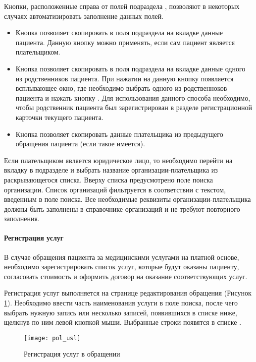 Кнопки, расположенные справа от полей подраздела , позволяют в некоторых случаях автоматизировать заполнение данных полей. 
\begin{itemize}
	\item Кнопка  позволяет скопировать в поля подраздела  на вкладке  данные пациента. Данную кнопку можно применять, если сам пациент является плательщиком.
	\item Кнопка  позволяет скопировать в поля подраздела  на вкладке  данные одного из родственников пациента. При нажатии на данную кнопку появляется всплывающее окно, где необходимо выбрать одного из родственноков пациента и нажать кнопку . Для использования данного способа необходимо, чтобы родственник пациента был зарегистрирован в разделе  регистрационной карточки текущего пациента.
	\item Кнопка  позволяет скопировать данные плательщика из предыдущего обращения пациента (если такое имеется).
\end{itemize} 

Если плательщиком является юридическое лицо, то необходимо перейти на вкладку  в подразделе  и выбрать название организации-плательщика из раскрывающегося списка. Вверху списка предусмотрено поле поиска организации. Список организаций фильтруется в соответствии с текстом, введенным в поле поиска. Все необходимые реквизиты организации-плательщика должны быть заполнены в справочнике организаций и не требуют повторного заполнения.

\paragraph{Регистрация услуг} \label{ev_regusl}

В случае обращения пациента за медицинскими услугами на платной основе, необходимо зарегистрировать список услуг, которые будут оказаны пациенту, согласовать стоимость и оформить договор на оказание соответствующих услуг.

Регистрация услуг выполняется на странице редактирования обращения (Рисунок \ref{img_pol_usl}). Необходимо ввести часть наименования услуги в поле поиска, после чего выбрать нужную запись или несколько записей, появившихся в списке ниже, щелкнув по ним левой кнопкой мыши. Выбранные строки появятся в списке .

\begin{figure}[ht]\centering
	\texttt{[image: pol\_usl]}
	\caption{Регистрация услуг в обращении}
	\label{img_pol_usl}
\end{figure}

